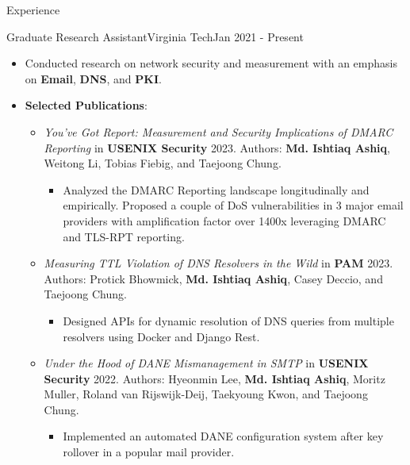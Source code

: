 \documentclass[]{mcdowellcv}
\begin{document}
	\makeheader
	
	\begin{cvsection}{Experience}
		\begin{cvsubsection}{Graduate Research Assistant}{Virginia Tech}{Jan 2021 - Present}
			\begin{itemize}
				\item Conducted research on network security and measurement with an emphasis on \textbf{Email}, \textbf{DNS}, and \textbf{PKI}.
				\item \textbf{Selected Publications}:
				\begin{itemize}
					\item \textit{You’ve Got Report: Measurement and Security Implications of DMARC Reporting} in \textbf{USENIX Security} 2023. Authors: \textbf{Md. Ishtiaq Ashiq}, Weitong Li, Tobias Fiebig, and Taejoong Chung. %
					\begin{itemize}
						\item Analyzed the DMARC Reporting landscape longitudinally and empirically. Proposed a couple of DoS vulnerabilities
						in 3 major email providers with amplification factor over 1400x leveraging DMARC and TLS-RPT reporting.
					\end{itemize}
					\item \textit{Measuring TTL Violation of DNS Resolvers in the Wild} in \textbf{PAM} 2023. Authors: Protick Bhowmick, \textbf{Md. Ishtiaq Ashiq}, Casey Deccio, and Taejoong Chung. %
					\begin{itemize}
						\item Designed APIs for dynamic resolution of DNS queries from multiple resolvers using Docker and Django Rest.
					\end{itemize}
					\item \textit{Under the Hood of DANE Mismanagement in SMTP} in \textbf{USENIX Security} 2022. Authors: Hyeonmin Lee, \textbf{Md. Ishtiaq Ashiq}, Moritz Muller, Roland van Rijswijk-Deij, Taekyoung Kwon, and Taejoong Chung. %
					\begin{itemize}
						\item Implemented an automated DANE configuration system after key rollover in a popular mail provider.
					\end{itemize}
				\end{itemize}
			\end{itemize}
		\end{cvsubsection}
		

\end{cvsection}
\end{document}
